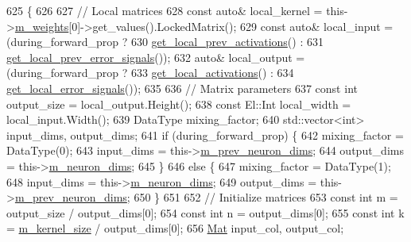 \begin{DoxyCode}
625                                                           \{
626 
627     \textcolor{comment}{// Local matrices}
628     \textcolor{keyword}{const} \textcolor{keyword}{auto}& local\_kernel = this->\hyperlink{classlbann_1_1Layer_a7954e30fbf9100a6ba4b56d02767a469}{m\_weights}[0]->get\_values().LockedMatrix();
629     \textcolor{keyword}{const} \textcolor{keyword}{auto}& local\_input = (during\_forward\_prop ?
630                                \hyperlink{classlbann_1_1Layer_a35397843bb0c84030000c7d872229acb}{get\_local\_prev\_activations}() :
631                                \hyperlink{classlbann_1_1Layer_a82827edc5e869960144f3ccb2172bfcd}{get\_local\_prev\_error\_signals}());
632     \textcolor{keyword}{auto}& local\_output = (during\_forward\_prop ?
633                           \hyperlink{classlbann_1_1Layer_a4248f27acebf72b7b7b3ee39c8bcb62a}{get\_local\_activations}() :
634                           \hyperlink{classlbann_1_1Layer_af178d00b9d878aa7d87754bff2a91f3a}{get\_local\_error\_signals}());
635 
636     \textcolor{comment}{// Matrix parameters}
637     \textcolor{keyword}{const} \textcolor{keywordtype}{int} output\_size = local\_output.Height();
638     \textcolor{keyword}{const} El::Int local\_width = local\_input.Width();
639     DataType mixing\_factor;
640     std::vector<int> input\_dims, output\_dims;
641     \textcolor{keywordflow}{if} (during\_forward\_prop) \{
642       mixing\_factor = DataType(0);
643       input\_dims = this->\hyperlink{classlbann_1_1Layer_ae204d1a2a79606eaa117273857ff62a3}{m\_prev\_neuron\_dims};
644       output\_dims = this->\hyperlink{classlbann_1_1Layer_abb34bb8031f57a483e2e327a5f229f48}{m\_neuron\_dims};
645     \}
646     \textcolor{keywordflow}{else} \{
647       mixing\_factor = DataType(1);
648       input\_dims = this->\hyperlink{classlbann_1_1Layer_abb34bb8031f57a483e2e327a5f229f48}{m\_neuron\_dims};
649       output\_dims = this->\hyperlink{classlbann_1_1Layer_ae204d1a2a79606eaa117273857ff62a3}{m\_prev\_neuron\_dims};
650     \}
651 
652     \textcolor{comment}{// Initialize matrices}
653     \textcolor{keyword}{const} \textcolor{keywordtype}{int} m = output\_size / output\_dims[0];
654     \textcolor{keyword}{const} \textcolor{keywordtype}{int} n = output\_dims[0];
655     \textcolor{keyword}{const} \textcolor{keywordtype}{int} k = \hyperlink{classlbann_1_1base__convolution__layer_aa9da3e44499643a86bd611b5eb500dd4}{m\_kernel\_size} / output\_dims[0];
656     \hyperlink{base_8hpp_a68f11fdc31b62516cb310831bbe54d73}{Mat} input\_col, output\_col;

\end{DoxyCode}
